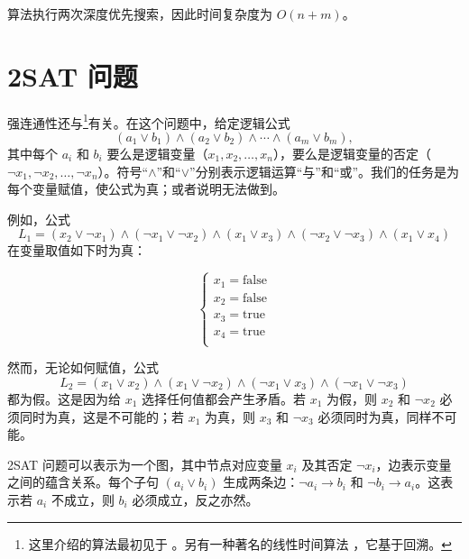 算法执行两次深度优先搜索，因此时间复杂度为 $O(n+m)$。

\section{2SAT 问题}


强连通性还与\footnote{这里介绍的算法最初见于 \cite{asp79}。另有一种著名的线性时间算法 \cite{eve75}，它基于回溯。}有关。在这个问题中，给定逻辑公式
\[
(a_1 \lor b_1) \land (a_2 \lor b_2) \land \cdots \land (a_m \lor b_m),
\]
其中每个 $a_i$ 和 $b_i$ 要么是逻辑变量（$x_1,x_2,\ldots,x_n$），要么是逻辑变量的否定（$\lnot x_1, \lnot x_2, \ldots, \lnot x_n$）。符号“$\land$”和“$\lor$”分别表示逻辑运算“与”和“或”。我们的任务是为每个变量赋值，使公式为真；或者说明无法做到。

例如，公式
\[
L_1 = (x_2 \lor \lnot x_1) \land
      (\lnot x_1 \lor \lnot x_2) \land
      (x_1 \lor x_3) \land
      (\lnot x_2 \lor \lnot x_3) \land
      (x_1 \lor x_4)
\]
在变量取值如下时为真：

\[
\begin{cases}
x_1 = \textrm{false} \\
x_2 = \textrm{false} \\
x_3 = \textrm{true} \\
x_4 = \textrm{true} \\
\end{cases}
\]

然而，无论如何赋值，公式
\[
L_2 = (x_1 \lor x_2) \land
      (x_1 \lor \lnot x_2) \land
      (\lnot x_1 \lor x_3) \land
      (\lnot x_1 \lor \lnot x_3)
\]
都为假。这是因为给 $x_1$ 选择任何值都会产生矛盾。若 $x_1$ 为假，则 $x_2$ 和 $\lnot x_2$ 必须同时为真，这是不可能的；若 $x_1$ 为真，则 $x_3$ 和 $\lnot x_3$ 必须同时为真，同样不可能。

2SAT 问题可以表示为一个图，其中节点对应变量 $x_i$ 及其否定 $\lnot x_i$，边表示变量之间的蕴含关系。每个子句 $(a_i \lor b_i)$ 生成两条边：$\lnot a_i \to b_i$ 和 $\lnot b_i \to a_i$。这表示若 $a_i$ 不成立，则 $b_i$ 必须成立，反之亦然。

